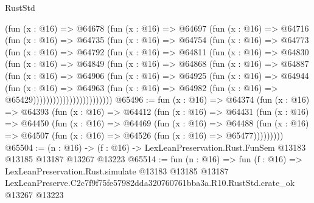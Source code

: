 \begin{lexlean}{RustStd}
\begin{coremodule}
                (fun (x : @16) =>
                @64678
                  (fun (x : @16) =>
                  @64697
                    (fun (x : @16) =>
                    @64716
                      (fun (x : @16) =>
                      @64735
                        (fun (x : @16) =>
                        @64754
                          (fun (x : @16) =>
                          @64773
                            (fun (x : @16) =>
                            @64792
                              (fun (x : @16) =>
                              @64811
                                (fun (x : @16) =>
                                @64830
                                  (fun (x : @16) =>
                                  @64849
                                    (fun (x : @16) =>
                                    @64868
                                      (fun (x : @16) =>
                                      @64887
                                        (fun (x : @16) =>
                                        @64906
                                          (fun (x : @16) =>
                                          @64925
                                            (fun (x : @16) =>
                                            @64944
                                              (fun (x : @16) =>
                                              @64963
                                                (fun (x : @16) =>
                                                @64982
                                                  (fun (x : @16) => @65429))))))))))))))))))))))))
@65496 := fun (x : @16) =>
  @64374
    (fun (x : @16) =>
    @64393
      (fun (x : @16) =>
      @64412
        (fun (x : @16) =>
        @64431
          (fun (x : @16) =>
          @64450
            (fun (x : @16) =>
            @64469
              (fun (x : @16) =>
              @64488
                (fun (x : @16) => @64507 (fun (x : @16) => @64526 (fun (x : @16) => @65477)))))))))
@65504 := (n : @16) ->
  (f : @16) -> LexLeanPreservation.Rust.FunSem @13183 @13185 @13187 @13267 @13223
@65514 := fun (n : @16) =>
  fun (f : @16) =>
  LexLeanPreservation.Rust.simulate
    @13183
    @13185
    @13187
    LexLeanPreserve.C2c7f9f75fe57982dda320760761bba3a.R10.RustStd.crate_ok
    @13267
    @13223
\end{coremodule}
\end{lexlean}
